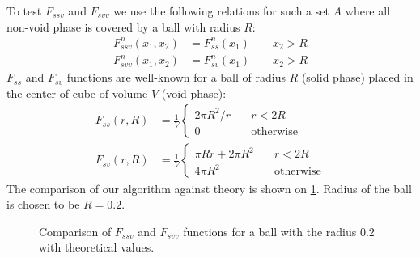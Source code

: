 \documentclass[reprint,amsmath,amssymb,aps,pre,showkeys,showpacs]{revtex4-1}
\begin{document}
To test $F_{ssv}$ and $F_{svv}$ we use the following relations for such a set
$A$ where all non-void phase is covered by a ball with radius $R$:
\begin{align}
  F^n_{ssv}(x_1, x_2) &= F^n_{ss}(x_1) \qquad x_2 > R \\
  F^n_{svv}(x_1, x_2) &= F^n_{sv}(x_1) \qquad x_2 > R
\end{align}
$F_{ss}$ and $F_{sv}$ functions are well-known for a ball of radius $R$ (solid
phase) placed in the center of cube of volume $V$ (void phase):
\begin{align}
  F_{ss}(r, R) &= \frac{1}{V} \left\{
    \begin{array}{ll}
      2\pi R^2/r & \quad r < 2R \\
      0 & \quad \text{otherwise}
    \end{array}
    \right.\\
  F_{sv}(r, R) &= \frac{1}{V} \left\{
    \begin{array}{ll}
      \pi Rr + 2\pi R^2 & \quad r < 2R \\
      4\pi R^2 & \quad \text{otherwise}
    \end{array}
    \right.
\end{align}
The comparison of our algorithm against theory is shown on
\cref{fig:surface-verification}. Radius of the ball is chosen to be $R=0.2$.
\begin{figure}[tp]
  \centering
  \hfill
  \caption[]{Comparison of $F_{ssv}$ and $F_{svv}$ functions for a ball with the
    radius $0.2$ with theoretical values.}
  \label{fig:surface-verification}
\end{figure}
\end{document}

